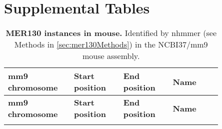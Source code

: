 \section{Supplemental Tables}

\begin{center}
\begin{longtable}{@{}p{0.25\linewidth}p{0.2\linewidth}p{0.2\linewidth}p{0.2\linewidth}@{}}
\caption[MER130 instances in mouse]{{\bf MER130 instances in mouse.}
Identified by nhmmer (see Methods in \ref{sec:mer130Methods}) in the NCBI37/mm9 mouse assembly.
}
\label{tab:mer130TabS1} \\

\hline \textbf{mm9 chromosome} & \textbf{Start position} & \textbf{End position} & \textbf{Name} \\ \hline 
\endfirsthead

\hline \textbf{mm9 chromosome} & \textbf{Start position} & \textbf{End
position} & \textbf{Name} \\ \hline 
\endhead

\hline
\endlastfoot


\end{longtable}
\end{center}
